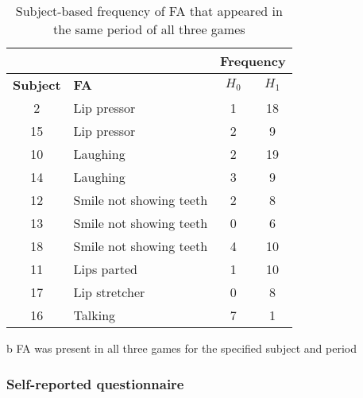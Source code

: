 \begin{table}[!t]
\renewcommand{\arraystretch}{1.3}
\caption{Subject-based frequency of FA that appeared in the same period of all three games}
\label{table:individual}
\centering
\begin{threeparttable}
\begin{tabular}{|c|p{4.8cm}|c|c|}
\cline{3-4}
\multicolumn{2}{c|}{} & \multicolumn{2}{|c|}{\textbf{Frequency}} \\
\hline
\textbf{Subject} & \textbf{FA} & \textbf{$H_0$} & \textbf{$H_1$} \\
\hline
2 & Lip pressor & 1 & 18\tnote{b} \\
\hline
15 & Lip pressor & 2 & 9\tnote{b} \\
\hline
10 & Laughing & 2 & 19\tnote{b} \\
\hline
14 & Laughing & 3 & 9\tnote{b} \\
\hline
12 & Smile not showing teeth & 2 & 8\tnote{b} \\
\hline
13 & Smile not showing teeth & 0 & 6\tnote{b} \\
\hline
18 & Smile not showing teeth & 4 & 10\tnote{b} \\
\hline
11 & Lips parted & 1 & 10\tnote{b} \\
\hline
17 & Lip stretcher & 0 & 8\tnote{b} \\
\hline
16 & Talking & 7\tnote{b} & 1 \\
\hline
\end{tabular}
\begin{tablenotes}
\small
\item[b]{FA was present in all three games for the specified subject and period}
\end{tablenotes}
\end{threeparttable}
\end{table}


\subsubsection{Self-reported questionnaire}

